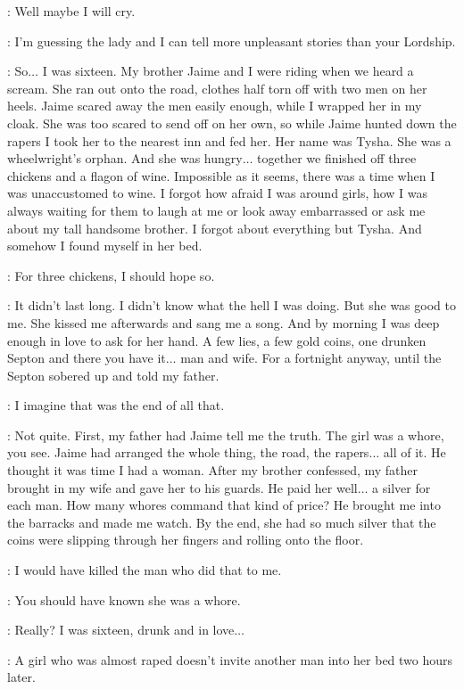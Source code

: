 \SHAE: Well maybe I will cry. 

\BRONN: I'm guessing the lady and I can tell more unpleasant stories than your Lordship. 

\TYRION: So$\ldots$ I was sixteen. My brother Jaime and I were riding when we heard a scream. She ran out onto the road, clothes half torn off with two men on her heels. Jaime scared away the men easily enough, while I wrapped her in my cloak. She was too scared to send off on her own, so while Jaime hunted down the rapers I took her to the nearest inn and fed her. Her name was Tysha. She was a wheelwright's orphan. And she was hungry$\ldots$ together we finished off three chickens and a flagon of wine. Impossible as it seems, there was a time when I was unaccustomed to wine. I forgot how afraid I was around girls, how I was always waiting for them to laugh at me or look away embarrassed or ask me about my tall handsome brother. I forgot about everything but Tysha. And somehow I found myself in her bed. 

\BRONN: For three chickens, I should hope so. 

\TYRION: It didn't last long. I didn't know what the hell I was doing. But she was good to me. She kissed me afterwards and sang me a song. And by morning I was deep enough in love to ask for her hand. A few lies, a few gold coins, one drunken Septon and there you have it$\ldots$ man and wife. For a fortnight anyway, until the Septon sobered up and told my father. 

\BRONN: I imagine that was the end of all that. 

\TYRION: Not quite. First, my father had Jaime tell me the truth. The girl was a whore, you see. Jaime had arranged the whole thing, the road, the rapers$\ldots$ all of it. He thought it was time I had a woman. After my brother confessed, my father brought in my wife and gave her to his guards. He paid her well$\ldots$  a silver for each man. How many whores command that kind of price? He brought me into the barracks and made me watch. By the end, she had so much silver that the coins were slipping through her fingers and rolling onto the floor. 

\BRONN: I would have killed the man who did that to me. 

\SHAE: You should have known she was a whore. 

\TYRION: Really? I was sixteen, drunk and in love$\ldots$  

\SHAE: A girl who was almost raped doesn't invite another man into her bed two hours later. 

